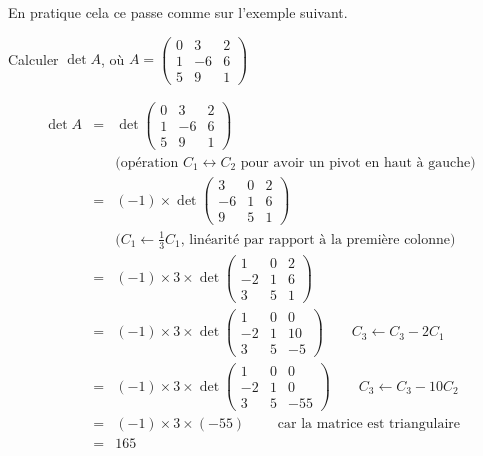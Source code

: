 \documentclass[class=report,crop=false]{standalone}
\begin{document}
En pratique cela ce passe comme sur l'exemple suivant.
\begin{exemple}
Calculer $\det A$, où
$A  = \begin{pmatrix}
        0 & 3 & 2\\
        1 & -6 & 6\\
        5 & 9 & 1
       \end{pmatrix}$

$$\begin{array}{rcl}
\det A
  & = & \det \begin{pmatrix}
        0 & 3 & 2\\
        1 & -6 & 6\\
        5 & 9 & 1
       \end{pmatrix} \\
  && \text{(opération $C_1 \leftrightarrow C_2$ pour avoir un pivot en haut à gauche)} \\    
  & = &  (-1)\times \det \begin{pmatrix}
        3 & 0 & 2\\
        -6& 1 & 6\\
        9 & 5 & 1
       \end{pmatrix} \\
  && \text{($C_1 \leftarrow \frac{1}{3} C_1$, linéarité par rapport à la première colonne)}\\     
  & = &  (-1)\times 3 \times \det \begin{pmatrix}
        1 & 0 & 2\\
        -2& 1 & 6\\
        3 & 5 & 1
       \end{pmatrix}  \\
  & = &  (-1)\times 3 \times \det \begin{pmatrix}
        1 & 0 & 0\\
        -2& 1 & 10\\
        3 & 5 & -5
       \end{pmatrix}  \qquad \text{$C_3 \leftarrow C_3-2C_1$} \\
  & = &  (-1)\times 3 \times \det \begin{pmatrix}
        1 & 0 & 0\\
        -2& 1 & 0\\
        3 & 5 & -55
       \end{pmatrix}  \qquad \text{$C_3 \leftarrow C_3-10C_2$} \\
  & = &  (-1)\times 3 \times (-55)  \qquad \text{ car la matrice est triangulaire} \\
  & = & 165
\end{array}$$
\end{exemple}
\end{document}
